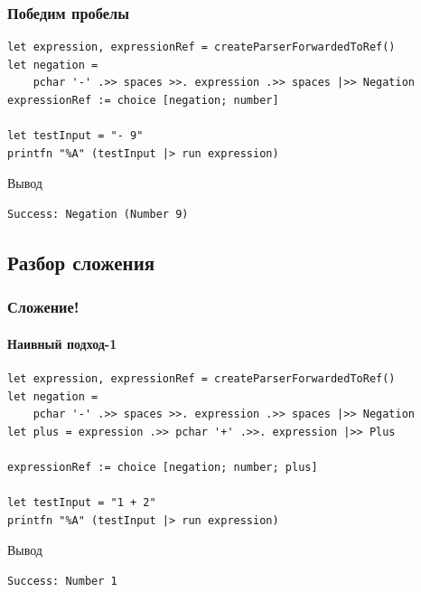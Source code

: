 \documentclass{../../slides-style}
\begin{document}
    \begin{frame}[fragile]
        \frametitle{Победим пробелы}
        \begin{verbatim}
let expression, expressionRef = createParserForwardedToRef()
let negation = 
    pchar '-' .>> spaces >>. expression .>> spaces |>> Negation
expressionRef := choice [negation; number]

let testInput = "- 9"
printfn "%A" (testInput |> run expression)
        \end{verbatim}

        \begin{exampleblock}{Вывод}
            \begin{verbatim}
Success: Negation (Number 9)
            \end{verbatim}
        \end{exampleblock}
    \end{frame}

    \subsection{Разбор сложения}

    \begin{frame}[fragile]
        \frametitle{Сложение!}
        \framesubtitle{Наивный подход-1}
        \begin{verbatim}
let expression, expressionRef = createParserForwardedToRef()
let negation = 
    pchar '-' .>> spaces >>. expression .>> spaces |>> Negation
let plus = expression .>> pchar '+' .>>. expression |>> Plus

expressionRef := choice [negation; number; plus]

let testInput = "1 + 2"
printfn "%A" (testInput |> run expression)
        \end{verbatim}

        \begin{exampleblock}{Вывод}
            \begin{verbatim}
Success: Number 1
            \end{verbatim}
        \end{exampleblock}
    \end{frame}
\end{document}
